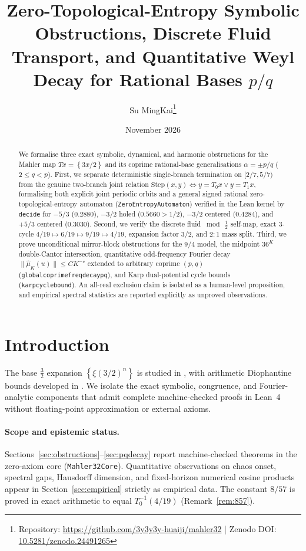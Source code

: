 \documentclass[11pt,a4paper]{article}
\title{Zero-Topological-Entropy Symbolic Obstructions, Discrete Fluid Transport, and Quantitative Weyl Decay for Rational Bases \texorpdfstring{$p/q$}{p/q}}
\author{Su MingKai\thanks{Repository: \url{https://github.com/3y3y3y-huaiji/mahler32} \;|\; Zenodo DOI: \href{https://doi.org/10.5281/zenodo.24491265}{10.5281/zenodo.24491265}}}
\date{November 2026}
\theoremstyle{remark}
\newcommand{\fract}[1]{\left\{#1\right\}}
\renewcommand{\_}{\textunderscore\allowbreak}
\newcommand{\lean}[1]{\texttt{#1}}
\begin{document}
\maketitle

\begin{abstract}
We formalise three exact symbolic, dynamical, and harmonic obstructions for the Mahler map $Tx=\fract{3x/2}$ and its coprime rational-base generalisations $\alpha=\pm p/q$ ($2\le q<p$). First, we separate deterministic single-branch termination on $[2/7,5/7)$ from the genuine two-branch joint relation $\mathrm{Step}(x,y)\iff y=T_0 x\lor y=T_1 x$, formalising both explicit joint periodic orbits and a general signed rational zero-topological-entropy automaton (\lean{ZeroEntropyAutomaton}) verified in the Lean kernel by \lean{decide} for $-5/3$ ($0.2880$), $-3/2$ holed ($0.5660>1/2$), $-3/2$ centered ($0.4284$), and $+5/3$ centered ($0.3030$). Second, we verify the discrete fluid $\bmod\,\tfrac12$ self-map, exact $3$-cycle $4/19\mapsto 6/19\mapsto 9/19\mapsto 4/19$, expansion factor $3/2$, and $2{:}1$ mass split. Third, we prove unconditional mirror-block obstructions for the $9/4$ model, the midpoint $36^K$ double-Cantor intersection, quantitative odd-frequency Fourier decay $\|\hat{\mu}_K(u)\|\le C K^{-c}$ extended to arbitrary coprime $(p,q)$ (\lean{global\_coprime\_freq\_decay\_pq}), and Karp dual-potential cycle bounds (\lean{karp\_cycle\_bound}). An all-real exclusion claim is isolated as a human-level proposition, and empirical spectral statistics are reported explicitly as unproved observations.
\end{abstract}

\tableofcontents

\section{Introduction}

The base $\tfrac32$ expansion $\fract{\xi(3/2)^n}$ is studied in \citep{strauch1997,lagarias2003,andrieu2026,cassaigne2026}, with arithmetic Diophantine bounds developed in \citep{stephan2026subspace,stephan2026minimal,stephan2026third,cook2026,calegari2025,elmv}. We isolate the exact symbolic, congruence, and Fourier-analytic components that admit complete machine-checked proofs in Lean~4 without floating-point approximation or external axioms.

\paragraph{Scope and epistemic status.}
Sections~\ref{sec:obstructions}--\ref{sec:pqdecay} report machine-checked theorems in the zero-axiom core (\lean{Mahler32Core}). Quantitative observations on chaos onset, spectral gaps, Hausdorff dimension, and fixed-horizon numerical cosine products appear in Section~\ref{sec:empirical} strictly as empirical data. The constant $8/57$ is proved in exact arithmetic to equal $T_0^{-1}(4/19)$ (Remark~\ref{rem:857}).
\end{document}
